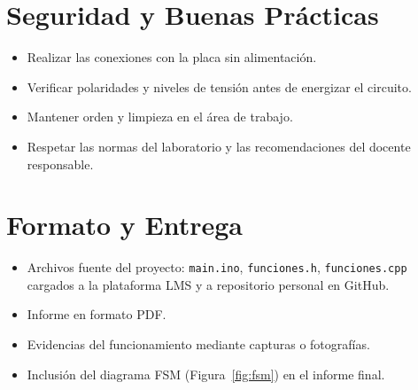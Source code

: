 \documentclass[12pt]{article}
\begin{document}
	\section{Seguridad y Buenas Prácticas}
	\begin{itemize}
		\item Realizar las conexiones con la placa sin alimentación.
		\item Verificar polaridades y niveles de tensión antes de energizar el circuito.
		\item Mantener orden y limpieza en el área de trabajo.
		\item Respetar las normas del laboratorio y las recomendaciones del docente responsable.
	\end{itemize}
	
	\section{Formato y Entrega}
	\begin{itemize}
		\item Archivos fuente del proyecto: \texttt{main.ino}, \texttt{funciones.h}, \texttt{funciones.cpp} cargados a la plataforma LMS y a repositorio personal en GitHub.
		\item Informe en formato PDF.
		\item Evidencias del funcionamiento mediante capturas o fotografías.
		\item Inclusión del diagrama FSM (Figura~\ref{fig:fsm}) en el informe final.
	\end{itemize}
\end{document}
